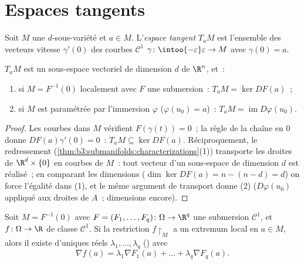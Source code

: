\section{Espaces tangents}

\begin{definition}\label{def:b3:submanifolds:tangent}
Soit $M$ une $d$-sous-variété et $a \in M$. L'\emph{espace
tangent} $T_aM$ est l'ensemble des
vecteurs vitesse $\gamma'(0)$ des courbes $\mathcal C^1$
$\gamma \colon \intoo{-\varepsilon}\varepsilon \to M$ avec
$\gamma(0) = a$.
\end{definition}

\begin{proposition}\label{prop:b3:submanifolds:tangent}
$T_aM$ est un sous-espace vectoriel de dimension $d$ de
$\R^n$, et~:
\begin{enumerate}
  \item si $M = F^{-1}(0)$ localement avec $F$ une submersion~:
        $T_aM = \ker DF(a)$~;
  \item si $M$ est paramétrée par l'immersion $\varphi$
        ($\varphi(u_0) = a$)~: $T_aM =
        \operatorname{im}D\varphi(u_0)$.
\end{enumerate}
\end{proposition}

\begin{proof}
Les courbes dans $M$ vérifient $F(\gamma(t)) = 0$~; la règle
de la chaîne en $0$ donne $DF(a)\gamma'(0) = 0$~: $T_aM
\subseteq \ker DF(a)$. Réciproquement, le redressement
(\cref{thm:b3:submanifolds:characterizations}(1)) transporte
les droites de $\R^d\times\{0\}$ en courbes de $M$~: tout
vecteur d'un sous-espace de dimension $d$ est réalisé~; en
comparant les dimensions ($\dim\ker DF(a) = n - (n - d) =
d$) on force l'égalité dans (1), et le même argument de
transport donne (2) ($D\varphi(u_0)$ appliqué aux droites de
$A$~; dimensions encore).
\end{proof}

\begin{theorem}
\label{thm:b3:submanifolds:lagrange}
Soit $M = F^{-1}(0)$ avec $F = (F_1, \dots, F_q) \colon
\Omega \to \R^q$ une submersion $\mathcal C^1$, et $f \colon
\Omega \to \R$ de classe $\mathcal C^1$. Si la restriction
$f\restriction_M$ a un extremum local en $a \in M$, alors il
existe d'uniques réels $\lambda_1, \dots, \lambda_q$
(\emph{}) avec
\[
\nabla f(a) = \lambda_1\nabla F_1(a) + \dots +
\lambda_q\nabla F_q(a) .
\]
\end{theorem}

